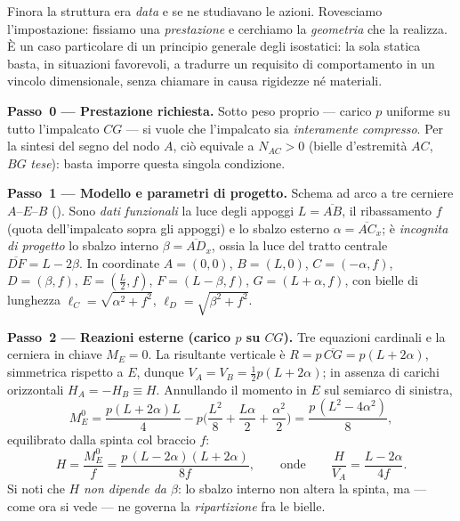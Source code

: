 	
\begin{esercizio}
	\label{ex:stampella_progetto}
	
	Finora la struttura era \emph{data} e se ne studiavano le azioni. Rovesciamo l'impostazione: fissiamo
	una \textit{prestazione} e cerchiamo la \emph{geometria} che la realizza. È un caso particolare di un
	principio generale degli isostatici: la sola statica basta, in situazioni favorevoli, a tradurre un
	requisito di comportamento in un vincolo dimensionale, senza chiamare in causa rigidezze né materiali.
	
	\medskip\noindent\textbf{Passo~0 --- Prestazione richiesta.}
	Sotto peso proprio --- carico $p$ uniforme su tutto l'impalcato $CG$ --- si vuole che l'impalcato sia
	\emph{interamente compresso}. Per la sintesi del segno del nodo $A$, ciò equivale a $N_{AC}>0$ (bielle
	d'estremità $AC$, $BG$ \emph{tese}): basta imporre questa singola condizione.
	
	\medskip\noindent\textbf{Passo~1 --- Modello e parametri di progetto.}
	Schema ad arco a tre cerniere $A$--$E$--$B$ (). Sono \emph{dati funzionali}
	la luce degli appoggi $L=\overline{AB}$, il ribassamento $f$ (quota dell'impalcato sopra gli appoggi) e
	lo sbalzo esterno $\alpha=\overline{AC}_x$; è \emph{incognita di progetto} lo sbalzo interno
	$\beta=\overline{AD}_x$, ossia la luce del tratto centrale $\overline{DF}=L-2\beta$. In coordinate
	$A=(0,0)$, $B=(L,0)$, $C=(-\alpha,f)$, $D=(\beta,f)$, $E=(\tfrac L2,f)$, $F=(L-\beta,f)$, $G=(L+\alpha,f)$,
	con bielle di lunghezza $\ell_C=\sqrt{\alpha^2+f^2}$, $\ell_D=\sqrt{\beta^2+f^2}$.
	



	
	\medskip\noindent\textbf{Passo~2 --- Reazioni esterne (carico $p$ su $CG$).}
	Tre equazioni cardinali e la cerniera in chiave $M_E=0$. La risultante verticale è
	$R=p\,\overline{CG}=p(L+2\alpha)$, simmetrica rispetto a $E$, dunque $V_A=V_B=\tfrac12 p(L+2\alpha)$; in
	assenza di carichi orizzontali $H_A=-H_B\equiv H$. Annullando il momento in $E$ sul semiarco di sinistra,
	\[
	M_E^{0}=\frac{p(L+2\alpha)L}{4}-p\Big(\frac{L^2}{8}+\frac{L\alpha}{2}+\frac{\alpha^2}{2}\Big)=\frac{p\,(L^2-4\alpha^2)}{8},
	\]
	equilibrato dalla spinta col braccio $f$:
	\[
	H=\frac{M_E^{0}}{f}=\frac{p\,(L-2\alpha)(L+2\alpha)}{8f},\qquad\text{onde}\qquad \frac{H}{V_A}=\frac{L-2\alpha}{4f}.
	\]
	Si noti che $H$ \emph{non dipende da $\beta$}: lo sbalzo interno non altera la spinta, ma --- come ora si
	vede --- ne governa la \emph{ripartizione} fra le bielle.
	

\end{esercizio}
